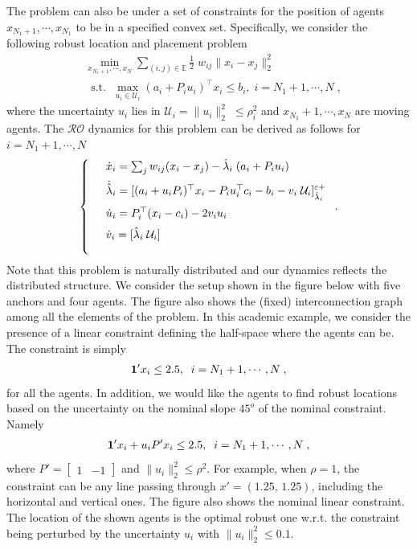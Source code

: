 \documentclass[journal,twoside,web]{ieeecolor}
\begin{document}
The problem can also be under a set of constraints for the position of agents $x_{N_1+1},\cdots,x_{N_1}$ to be in a specified convex set. Specifically, we consider the following robust location and placement problem
\begin{align*}
    &\min_{x_{N_1+1},\cdots,x_N} \sum_{(i,j)\in {\mathbb E}} \frac{1}{2}\; w_{ij} \parallel x_i - x_j \parallel_2^2\\
    &\;\;\text{s.t.}\;\;\underset{u_i\in \mathcal{U}_i}{\max} (a_i+P_i u_i)^\top x_i \leq b_i, \; i={N_1+1},\cdots,N\;,
\end{align*}
where the uncertainty $u_i$ lies in $\mathcal{U}_i = \parallel u_i \parallel_2^2\; \leq \rho_i^2$ and $x_{N_1}+1,\cdots,x_{N}$ are moving agents. The $\mathcal{RO}$ dynamics for this problem can be derived as follows for $i=N_1+1,\cdots,N$
\begin{align*}
\left\{
\begin{array}{cl}
\vspace{2mm}
&\dot{x}_i=\sum_j w_{ij} (x_i-x_j)-\hat \lambda_i \; (a_i+P_i u_i)\\
\vspace{2mm}
&\dot{\hat \lambda}_i=[(a_i+u_i P_i)^\top x_i-P_i u_i^\top c_i-b_i-v_i\; \mathcal{U}_i]_{\hat \lambda_i}^{\varepsilon+}\\
\vspace{2mm}
&\dot{u}_i=P_i^\top (x_i-c_i)-2v_i u_i\\
\vspace{2mm}
&\dot{v}_i=[\hat \lambda_i\; \mathcal{U}_i]
\vspace{2mm}
\end{array}\right..
\end{align*}
Note that this problem is naturally distributed and our dynamics reflects the distributed structure. We consider the setup shown in the figure below with five anchors and four agents. The figure also shows the (fixed) interconnection graph among all the elements of the problem. In this academic example, we consider the presence of a linear constraint defining the half-space where the agents can be. The constraint is simply
\begin{align*}
{\bf 1}'x_i\leq 2.5, \;\; i=N_1+1,\cdots,N\;,
\end{align*}
for all the agents.
In addition, we would like the agents to find robust locations based on the uncertainty on the nominal slope $45^o$ of the nominal constraint. Namely
\begin{align*}
{\bf 1}'x_i+u_iP'x_i\leq 2.5,\;\; i=N_1+1,\cdots,N\;,
\end{align*}
where $P'=\begin{bmatrix}1&-1\end{bmatrix}$ and $\|u_i\|_2^2\leq \rho^2$. For example, when $\rho=1$, the constraint can be any line passing through $x'=(1.25,\,1.25)$, including the horizontal and vertical ones. The figure also shows the nominal linear constraint. The location of the shown agents is the optimal robust one w.r.t. the constraint being perturbed by the uncertainty $u_i$ with $\|u_i\|_2^2\leq 0.1$.
\end{document}

